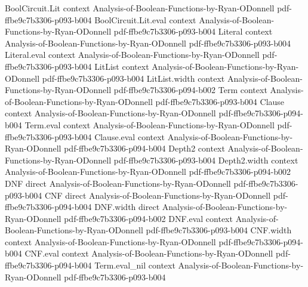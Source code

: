 \begin{lemma}
\leanok
{}
\proofstep
  {BoolCircuit.Lit}
  {context}
  {Analysis-of-Boolean-Functions-by-Ryan-ODonnell}
  {pdf-ffbe9c7b3306-p093-b004}
\proofstep
  {BoolCircuit.Lit.eval}
  {context}
  {Analysis-of-Boolean-Functions-by-Ryan-ODonnell}
  {pdf-ffbe9c7b3306-p093-b004}
\proofstep
  {Literal}
  {context}
  {Analysis-of-Boolean-Functions-by-Ryan-ODonnell}
  {pdf-ffbe9c7b3306-p093-b004}
\proofstep
  {Literal.eval}
  {context}
  {Analysis-of-Boolean-Functions-by-Ryan-ODonnell}
  {pdf-ffbe9c7b3306-p093-b004}
\proofstep
  {LitList}
  {context}
  {Analysis-of-Boolean-Functions-by-Ryan-ODonnell}
  {pdf-ffbe9c7b3306-p093-b004}
\proofstep
  {LitList.width}
  {context}
  {Analysis-of-Boolean-Functions-by-Ryan-ODonnell}
  {pdf-ffbe9c7b3306-p094-b002}
\proofstep
  {Term}
  {context}
  {Analysis-of-Boolean-Functions-by-Ryan-ODonnell}
  {pdf-ffbe9c7b3306-p093-b004}
\proofstep
  {Clause}
  {context}
  {Analysis-of-Boolean-Functions-by-Ryan-ODonnell}
  {pdf-ffbe9c7b3306-p094-b004}
\proofstep
  {Term.eval}
  {context}
  {Analysis-of-Boolean-Functions-by-Ryan-ODonnell}
  {pdf-ffbe9c7b3306-p093-b004}
\proofstep
  {Clause.eval}
  {context}
  {Analysis-of-Boolean-Functions-by-Ryan-ODonnell}
  {pdf-ffbe9c7b3306-p094-b004}
\proofstep
  {Depth2}
  {context}
  {Analysis-of-Boolean-Functions-by-Ryan-ODonnell}
  {pdf-ffbe9c7b3306-p093-b004}
\proofstep
  {Depth2.width}
  {context}
  {Analysis-of-Boolean-Functions-by-Ryan-ODonnell}
  {pdf-ffbe9c7b3306-p094-b002}
\proofstep
  {DNF}
  {direct}
  {Analysis-of-Boolean-Functions-by-Ryan-ODonnell}
  {pdf-ffbe9c7b3306-p093-b004}
\proofstep
  {CNF}
  {direct}
  {Analysis-of-Boolean-Functions-by-Ryan-ODonnell}
  {pdf-ffbe9c7b3306-p094-b004}
\proofstep
  {DNF.width}
  {direct}
  {Analysis-of-Boolean-Functions-by-Ryan-ODonnell}
  {pdf-ffbe9c7b3306-p094-b002}
\proofstep
  {DNF.eval}
  {context}
  {Analysis-of-Boolean-Functions-by-Ryan-ODonnell}
  {pdf-ffbe9c7b3306-p093-b004}
\proofstep
  {CNF.width}
  {context}
  {Analysis-of-Boolean-Functions-by-Ryan-ODonnell}
  {pdf-ffbe9c7b3306-p094-b004}
\proofstep
  {CNF.eval}
  {context}
  {Analysis-of-Boolean-Functions-by-Ryan-ODonnell}
  {pdf-ffbe9c7b3306-p094-b004}
\proofstep
  {Term.eval_nil}
  {context}
  {Analysis-of-Boolean-Functions-by-Ryan-ODonnell}
  {pdf-ffbe9c7b3306-p093-b004}
\proofstep

\end{lemma}
